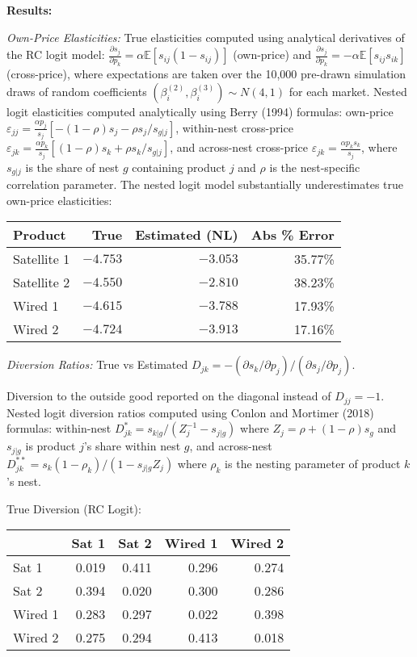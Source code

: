 \documentclass[english,11pt]{article}
\begin{document}
\begin{enumerate}
\textbf{Results:}

\textit{Own-Price Elasticities:} True elasticities computed using analytical derivatives of the RC logit model: $\frac{\partial s_j}{\partial p_k} = \alpha \mathbb{E}[s_{ij}(1-s_{ij})]$ (own-price) and $\frac{\partial s_j}{\partial p_k} = -\alpha \mathbb{E}[s_{ij}s_{ik}]$ (cross-price), where expectations are taken over the 10,000 pre-drawn simulation draws of random coefficients $(\beta_i^{(2)}, \beta_i^{(3)}) \sim N(4,1)$ for each market. Nested logit elasticities computed analytically using Berry (1994) formulas: own-price $\varepsilon_{jj} = \frac{\alpha p_j}{s_j}[-(1-\rho)s_j - \rho s_j/s_{g|j}]$, within-nest cross-price $\varepsilon_{jk} = \frac{\alpha p_k}{s_j}[(1-\rho)s_k + \rho s_k/s_{g|j}]$, and across-nest cross-price $\varepsilon_{jk} = \frac{\alpha p_k s_k}{s_j}$, where $s_{g|j}$ is the share of nest $g$ containing product $j$ and $\rho$ is the nest-specific correlation parameter. The nested logit model substantially underestimates true own-price elasticities:


\begin{center}
\begin{tabular}{lrrr}
\hline
Product & True & Estimated (NL) & Abs \% Error \\
\hline
Satellite 1 & $-4.753$ & $-3.053$ & 35.77\% \\
Satellite 2 & $-4.550$ & $-2.810$ & 38.23\% \\
Wired 1 & $-4.615$ & $-3.788$ & 17.93\% \\
Wired 2 & $-4.724$ & $-3.913$ & 17.16\% \\
\hline
\end{tabular}
\end{center}

\textit{Diversion Ratios:} 
True vs Estimated $D_{jk} = -(\partial s_k/\partial p_j) / (\partial s_j/\partial p_j).$ 

Diversion to the outside good reported on the diagonal instead of $D_{jj}=-1.$ Nested logit diversion ratios computed using Conlon and Mortimer (2018) formulas: within-nest $D_{jk}^* = s_{k|g} / (Z_j^{-1} - s_{j|g})$ where $Z_j = \rho + (1-\rho)s_g$ and $s_{j|g}$ is product $j$'s share within nest $g$, and across-nest $D_{jk}^{**} = s_k(1-\rho_k) / (1 - s_{j|g}Z_j)$ where $\rho_k$ is the nesting parameter of product $k$'s nest.

True Diversion (RC Logit):
\begin{center}
\begin{tabular}{lrrrr}
\hline
 & Sat 1 & Sat 2 & Wired 1 & Wired 2 \\
\hline
Sat 1 & 0.019 & 0.411 & 0.296 & 0.274 \\
Sat 2 & 0.394 & 0.020 & 0.300 & 0.286 \\
Wired 1 & 0.283 & 0.297 & 0.022 & 0.398 \\
Wired 2 & 0.275 & 0.294 & 0.413 & 0.018 \\
\hline
\end{tabular}
\end{center}


\end{enumerate}
\end{document}
